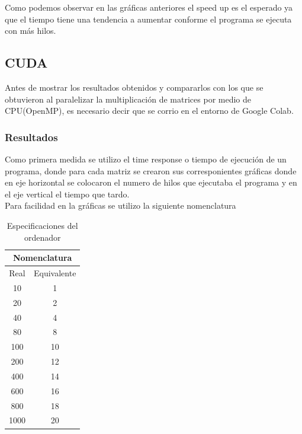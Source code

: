 \documentclass{IEEEtran}
\begin{document}
Como podemos observar en las gráficas anteriores el speed up es el esperado ya que el tiempo tiene una tendencia a aumentar conforme el programa se ejecuta con más hilos.\\


\subsection{CUDA}
Antes de mostrar los resultados obtenidos y compararlos con los que se obtuvieron al paralelizar la   multiplicación de  matrices
 por  medio de CPU(OpenMP), es necesario decir que se corrio en el entorno de Google Colab. 


\subsubsection{Resultados}
Como primera medida se utilizo el time response o tiempo de ejecución de un programa, donde para cada matriz se crearon sus corresponientes gráficas donde en eje horizontal se colocaron el numero  de hilos que ejecutaba el programa y en el eje vertical el tiempo que tardo.\\
Para facilidad  en la gráficas se utilizo la  siguiente nomenclatura\\

\begin{table}[H]
    \centering
        \begin{tabular}{ |c|c| } 
    \hline
    \multicolumn{2}{|c|}{Nomenclatura} \\
    \hline
    Real & Equivalente\\
     \hline
     10 & 1 \\ 
     \hline
     20 & 2 \\ 
     \hline
     40 & 4\\ 
     \hline
     80 & 8\\ 
     \hline
     100  & 10 \\ 
     \hline
     200  & 12 \\ 
     \hline
     400  & 14 \\ 
     \hline
     600  & 16 \\ 
     \hline
     800  & 18 \\ 
     \hline
     1000  & 20 \\ 
     \hline
    \end{tabular}
    \caption{Especificaciones del ordenador}
    \end{table}
\end{document}
